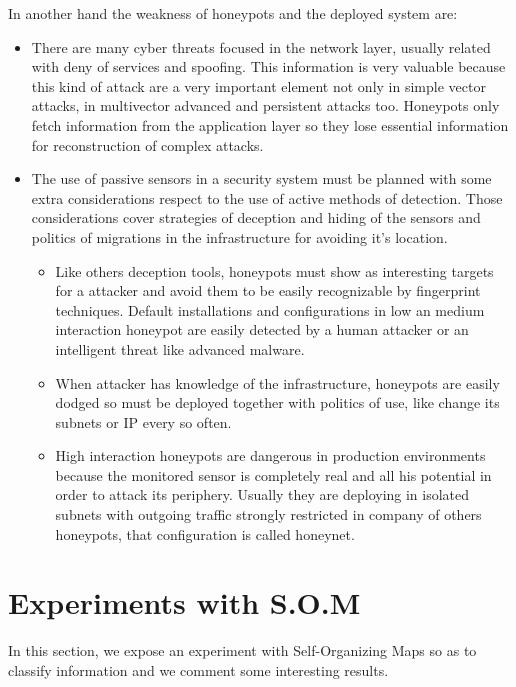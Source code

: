 \documentclass[a4paper]{llncs}
\begin{document}
In another hand the weakness of honeypots and the deployed system are:
\begin{itemize}
	\item There are many cyber threats focused in the network layer, usually related with deny of services and spoofing. This information is very valuable because this kind of attack are a very important element not only in simple vector attacks, in multivector advanced and persistent attacks too. Honeypots only fetch information from the application layer so they lose essential information for reconstruction of complex attacks.
	\item The use of passive sensors in a security system must be planned with some extra considerations respect to the use of active methods of detection. Those considerations cover strategies of deception and hiding of the sensors and politics of migrations in the infrastructure for avoiding it's location.
	\begin{itemize}
		\item Like others deception tools, honeypots must show as interesting targets for a attacker and avoid them to be easily recognizable by fingerprint techniques. Default installations and configurations in low an medium interaction honeypot are easily detected by a human attacker or an intelligent threat like advanced malware.
		\item When attacker has knowledge of the infrastructure, honeypots are easily dodged so must be deployed together with politics of use, like change its subnets or IP every so often.
		\item High interaction honeypots are dangerous in production environments because the monitored sensor is completely real and all his potential in order to attack its periphery. Usually they are deploying in isolated subnets with outgoing traffic strongly restricted in company of others honeypots, that configuration is called honeynet.
	\end{itemize}
\end{itemize}

\section{Experiments with S.O.M}
\label{sec:Improve}
In this section, we expose an experiment with Self-Organizing Maps so as to classify information and we comment some interesting results.
\end{document}
